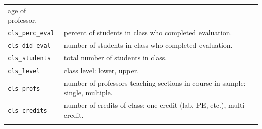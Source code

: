 \documentclass[]{book}
\theoremstyle{definition}
\theoremstyle{definition}
\theoremstyle{remark}
\begin{document}
\begin{longtable}[]{@{}ll@{}}
\begin{minipage}[t]{0.16\columnwidth}
age of professor.\strut
\end{minipage}\tabularnewline
\begin{minipage}[t]{0.22\columnwidth}\raggedright\strut
\texttt{cls\_perc\_eval}\strut
\end{minipage} & \begin{minipage}[t]{0.16\columnwidth}\raggedright\strut
percent of students in class who completed evaluation.\strut
\end{minipage}\tabularnewline
\begin{minipage}[t]{0.22\columnwidth}\raggedright\strut
\texttt{cls\_did\_eval}\strut
\end{minipage} & \begin{minipage}[t]{0.16\columnwidth}\raggedright\strut
number of students in class who completed evaluation.\strut
\end{minipage}\tabularnewline
\begin{minipage}[t]{0.22\columnwidth}\raggedright\strut
\texttt{cls\_students}\strut
\end{minipage} & \begin{minipage}[t]{0.16\columnwidth}\raggedright\strut
total number of students in class.\strut
\end{minipage}\tabularnewline
\begin{minipage}[t]{0.22\columnwidth}\raggedright\strut
\texttt{cls\_level}\strut
\end{minipage} & \begin{minipage}[t]{0.16\columnwidth}\raggedright\strut
class level: lower, upper.\strut
\end{minipage}\tabularnewline
\begin{minipage}[t]{0.22\columnwidth}\raggedright\strut
\texttt{cls\_profs}\strut
\end{minipage} & \begin{minipage}[t]{0.16\columnwidth}\raggedright\strut
number of professors teaching sections in course in sample: single,
multiple.\strut
\end{minipage}\tabularnewline
\begin{minipage}[t]{0.22\columnwidth}\raggedright\strut
\texttt{cls\_credits}\strut
\end{minipage} & \begin{minipage}[t]{0.16\columnwidth}\raggedright\strut
number of credits of class: one credit (lab, PE, etc.), multi
credit.\strut
\end{minipage}\tabularnewline
\begin{minipage}[t]{0.22\columnwidth}\raggedright\strut

\end{minipage}
\end{longtable}
\end{document}
